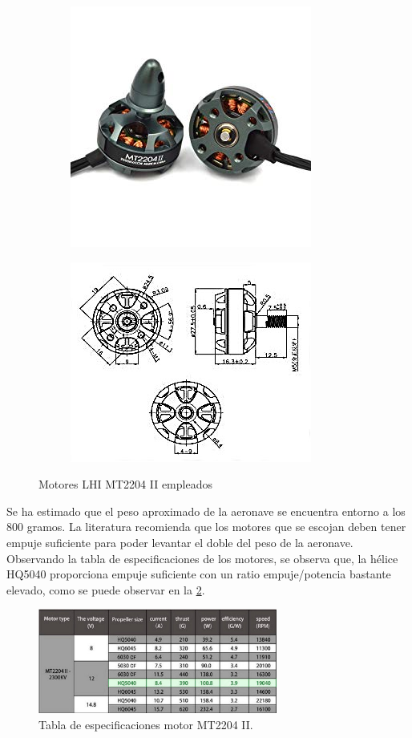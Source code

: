 \begin{figure}[htb!]
	\centering
	\begin{subfigure}{0.4\textwidth}
		\centering
		\includegraphics[height=0.2\textheight]{hardware/motores.jpg}
	\end{subfigure}
	\begin{subfigure}{0.4\textwidth}
	\centering
	\includegraphics[height=0.2\textheight]{hardware/motoresPlanos}
\end{subfigure}
	\caption{Motores LHI MT2204 II empleados}
\label{hardware:motores}
\end{figure}

Se ha estimado que el peso aproximado de la aeronave se encuentra entorno a los 800 gramos. La literatura recomienda que los motores que se escojan deben tener empuje suficiente para poder levantar el doble del peso de la aeronave. Observando la tabla de especificaciones de los motores, se observa que, la hélice HQ5040 proporciona empuje suficiente con un ratio empuje/potencia bastante elevado, como se puede observar en la \cref{hardware:motoresTabla}.

\begin{figure}[htb!]
	\centering
	\includegraphics[width=0.7\textwidth]{hardware/MT2203_Table.jpeg}
	\caption{Tabla de especificaciones motor MT2204 II. }
	\label{hardware:motoresTabla}
\end{figure}

